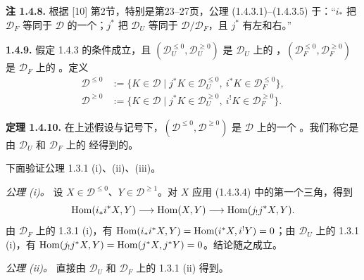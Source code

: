 \par\medskip\noindent\textbf{注 1.4.8.}
根据 [10] 第2节，特别是第23--27页，公理 (1.4.3.1)--(1.4.3.5) 于：“$i_*$ 把 $\mathcal D_F$ 等同于 $\mathcal D$ 的一个；$j^*$ 把 $\mathcal D_U$ 等同于 $\mathcal D/\mathcal D_F$，且 $j^*$ 有左和右。”

\par\medskip\noindent\textbf{1.4.9.}
假定 1.4.3 的条件成立，且 $(\mathcal D_U^{\le0},\mathcal D_U^{\ge0})$ 是 $\mathcal D_U$ 上的 ，$(\mathcal D_F^{\le0},\mathcal D_F^{\ge0})$ 是 $\mathcal D_F$ 上的 。定义
\[
\begin{aligned}
\mathcal D^{\le0}&:=\{K\in\mathcal D\mid j^*K\in\mathcal D_U^{\le0},\ i^*K\in\mathcal D_F^{\le0}\},\\
\mathcal D^{\ge0}&:=\{K\in\mathcal D\mid j^*K\in\mathcal D_U^{\ge0},\ i^!K\in\mathcal D_F^{\ge0}\}.
\end{aligned}
\]

\par\medskip\noindent\textbf{定理 1.4.10.}
在上述假设与记号下，$(\mathcal D^{\le0},\mathcal D^{\ge0})$ 是 $\mathcal D$ 上的一个 。我们称它是由 $\mathcal D_U$ 和 $\mathcal D_F$ 上的 经得到的。

下面验证公理 1.3.1 (i)、(ii)、(iii)。

\emph{公理 (i)。} 设 $X\in\mathcal D^{\le0}$、$Y\in\mathcal D^{\ge1}$。对 $X$ 应用 (1.4.3.4) 中的第一个三角，得到
\[
\operatorname{Hom}(i_*i^*X,Y)\longrightarrow\operatorname{Hom}(X,Y)\longrightarrow\operatorname{Hom}(j_!j^*X,Y).
\]
由 $\mathcal D_F$ 上的 1.3.1 (i)，有 $\operatorname{Hom}(i_*i^*X,Y)=\operatorname{Hom}(i^*X,i^!Y)=0$；由 $\mathcal D_U$ 上的 1.3.1 (i)，有 $\operatorname{Hom}(j_!j^*X,Y)=\operatorname{Hom}(j^*X,j^*Y)=0$。结论随之成立。

\emph{公理 (ii)。} 直接由 $\mathcal D_U$ 和 $\mathcal D_F$ 上的 1.3.1 (ii) 得到。

